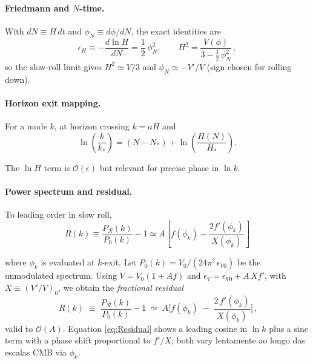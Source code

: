 \documentclass[12pt]{article}
\begin{document}
\paragraph{Friedmann and $N$-time.}
With $dN\equiv H\,dt$ and $\phi_N\equiv d\phi/dN$, the exact identities are
\begin{equation}
\epsilon_H\equiv -\frac{d\ln H}{dN}=\frac12\,\phi_N^2,\qquad
H^2=\frac{V(\phi)}{3-\tfrac12\,\phi_N^2}\,,
\label{eq:FriedmannN}
\end{equation}
so the slow-roll limit gives $H^2\simeq V/3$ and $\phi_N\simeq -V'/V$ (sign chosen for rolling down).

\paragraph{Horizon exit mapping.}
For a mode $k$, at horizon crossing $k=aH$ and
\begin{equation}
\ln\left(\frac{k}{k_*}\right) = (N - N_*) + \ln\left(\frac{H(N)}{H_*}\right).
\end{equation}

The $\ln H$ term is $\mathcal{O}(\epsilon)$ but relevant for precise phase in $\ln k$.

\paragraph{Power spectrum and residual.}
To leading order in slow roll,
\begin{equation}
\boxed{~
R(k) \equiv \frac{P_{\mathcal R}(k)}{P_{0}(k)} - 1 
\simeq A\left[f(\phi_k) - \frac{2 f'(\phi_k)}{X(\phi_k)}\right]
~}
\end{equation}

where $\phi_k$ is evaluated at $k$-exit. Let $P_0(k)=V_0/(24\pi^2\,\epsilon_{V0})$ be the unmodulated spectrum. Using $V=V_0(1+Af)$ and $\epsilon_V=\epsilon_{V0}+A\,X f'$, with $X\equiv(V'/V)_0$, we obtain the \emph{fractional residual}
\begin{equation}
\boxed{~
R(k)\;\equiv\;\frac{P_{\mathcal R}(k)}{P_0(k)}-1
\;\simeq\;
A\Bigg[f(\phi_k)\;-\; \frac{2\,f'(\phi_k)}{X(\phi_k)}\Bigg]
\,,}
\label{eq:Residual}
\end{equation}
valid to $\mathcal{O}(A)$. Equation \eqref{eq:Residual} shows a leading cosine in $\ln k$ plus a sine term with a phase shift proportional to $f'/X$; both vary lentamente ao longo das escalas CMB via $\phi_k$.
\end{document}

